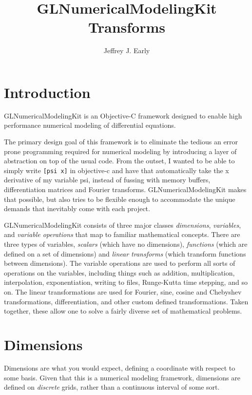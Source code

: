 \documentclass[11pt]{article}
\title{GLNumericalModelingKit Transforms}
\author{Jeffrey J. Early}
\begin{document}
\maketitle

%
%
\section{Introduction}

GLNumericalModelingKit is an Objective-C framework designed to enable high performance numerical modeling of differential equations.

The primary design goal of this framework is to eliminate the tedious an error prone programming required for numerical modeling by introducing a layer of abstraction on top of the usual code. From the outset, I wanted to be able to simply write \texttt{[psi x]} in objective-c and have that automatically take the x derivative of my variable psi, instead of fussing with memory buffers, differentiation matrices and Fourier transforms. GLNumericalModelingKit makes that possible, but also tries to be flexible enough to accommodate the unique demands that inevitably come with each project.

GLNumericalModelingKit consists of three major classes \emph{dimensions}, \emph{variables}, and \emph{variable operations} that map to familiar mathematical concepts. There are three types of variables, \emph{scalars} (which have no dimensions), \emph{functions} (which are defined on a set of dimensions) and \emph{linear transforms} (which transform functions between dimensions). The variable operations are used to perform all sorts of operations on the variables, including things such as addition, multiplication, interpolation, exponentiation, writing to files, Runge-Kutta time stepping, and so on. The linear transformations are used for Fourier, sine, cosine and Chebyshev transformations, differentiation, and other custom defined transformations. Taken together, these allow one to solve a fairly diverse set of mathematical problems.


%
%
\section{Dimensions}

Dimensions are what you would expect, defining a coordinate with respect to some basis. Given that this is a numerical modeling framework, dimensions are defined on \emph{discrete} grids, rather than a continuous interval of some sort.
\end{document}

